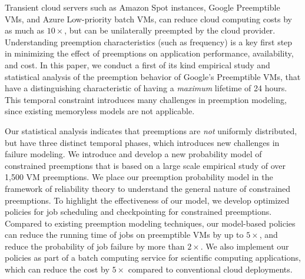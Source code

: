 Transient cloud servers such as Amazon Spot instances, Google Preemptible VMs, and Azure Low-priority batch VMs, can reduce cloud computing costs by as much as $10\times$, but can be unilaterally preempted by the cloud provider.
Understanding preemption characteristics (such as frequency) is a key first step in minimizing the effect of preemptions on application performance, availability, and cost. 
In this paper, we conduct a first of its kind empirical study and statistical analysis of the preemption behavior of Google's Preemptible VMs, 
that have a distinguishing characteristic of having a \emph{maximum} lifetime of 24 hours. 
This temporal constraint introduces many challenges in preemption modeling, since existing memoryless models are not applicable. 

Our statistical analysis indicates that preemptions are \emph{not} uniformly distributed, but have three distinct temporal phases, which introduces new challenges in failure modeling.  
We introduce and develop a new probability model of constrained preemptions that is based on a large scale empirical study of over 1,500 VM preemptions. 
We place our preemption probability model in the framework of reliability theory to understand the general nature of constrained preemptions. 
To highlight the effectiveness of our model, we develop optimized policies for job scheduling and checkpointing for constrained preemptions. 
Compared to existing preemption modeling techniques, our model-based policies can reduce the running time of jobs on preemptible VMs by up to $5\times$, and reduce the probability of job failure by more than $2\times$. 
We also implement our policies as part of a batch computing service for scientific computing applications, which can reduce the cost by $5\times$ compared to conventional cloud deployments.







